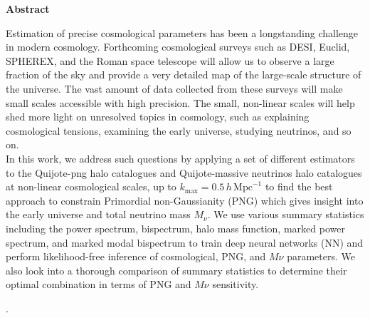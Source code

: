 \newpage
\begin{center}
    \huge \textbf{Abstract}
\end{center}

\vspace{0.5in}

Estimation of precise cosmological parameters has been a longstanding challenge in modern cosmology. Forthcoming cosmological surveys such as DESI, Euclid, SPHEREX, and the Roman space telescope will allow us to observe a large fraction of the sky and provide a very detailed map of the large-scale structure of the universe. The vast amount of data collected from these surveys will make small scales accessible with high precision. The small, non-linear scales will help shed more light on unresolved topics in cosmology, such as explaining cosmological tensions, examining the early universe, studying neutrinos, and so on.\\
In this work, we address such questions by applying a set of different estimators to the Quijote-png halo catalogues and Quijote-massive neutrinos halo catalogues at non-linear cosmological scales, up to \( k_{\text{max}} = 0.5 \, h \, \text{Mpc}^{-1} \) to find the best approach to constrain Primordial non-Gaussianity (PNG) which gives insight into the early universe and total neutrino mass \( M_{\nu} \). We use various summary statistics including the power spectrum, bispectrum, halo mass function, marked power spectrum, and marked modal bispectrum to train deep neural networks (NN) and perform likelihood-free inference of cosmological, PNG, and $M\nu$ parameters. We also look into a thorough comparison of summary statistics to determine their optimal combination in terms of PNG and $M\nu$ sensitivity.

.



